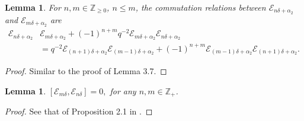 \documentclass[12pt]{amsart}
\newtheorem{lemma}[theorem]{Lemma}
\numberwithin{equation}{section}
\numberwithin{equation}{section}
\begin{document}
\begin{lemma} 
For \(n,m\in\mathbb{Z}_{\ge 0}\), \(n\le m\), the commutation relations between \(\mathcal{E}_{n\delta+\alpha_{2}}\) and \(\mathcal{E}_{m\delta+\alpha_{2}}\) are 
\begin{align*}  
\mathcal{E}_{n\delta+\alpha_{2}}&\mathcal{E}_{m\delta+\alpha_{2}}+(-1)^{n+m}q^{-2}\mathcal{E}_{m\delta+\alpha_{2}}\mathcal{E}_{n\delta+\alpha_{2}}\\ &=q^{-2}\mathcal{E}_{(n+1)\delta+\alpha_{2}}\mathcal{E}_{(m-1)\delta+\alpha_{2}}+(-1)^{n+m}\mathcal{E}_{(m-1)\delta+\alpha_{2}}\mathcal{E}_{(n+1)\delta+\alpha_{2}}. 
\end{align*}
\end{lemma}
\begin{proof} 
Similar to the proof of Lemma 3.7.
\end{proof}

\begin{lemma} 
$[\mathcal{E}_{m\delta},\mathcal{E}_{n\delta}]=0,$ for any $n,m\in\mathbb{Z}_+$.
\end{lemma}
\begin{proof}
See that of Proposition 2.1 in \cite{HZhuang}.
\end{proof}
\end{document}
